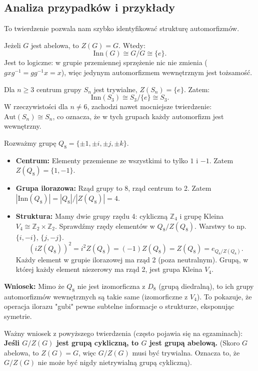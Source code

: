 \subsection{Analiza przypadków i przykłady}

To twierdzenie pozwala nam szybko identyfikować strukturę automorfizmów.

\begin{eg}
Jeżeli $G$ jest abelowa, to $Z(G) = G$. Wtedy:
\[ \text{Inn}(G) \cong G/G \cong \{e\}. \]
Jest to logiczne: w grupie przemiennej sprzężenie nic nie zmienia ($gxg^{-1} = gg^{-1}x = x$), więc jedynym automorfizmem wewnętrznym jest tożsamość.
\end{eg}

\begin{eg}
Dla $n \ge 3$ centrum grupy $S_n$ jest trywialne, $Z(S_n) = \{e\}$.
Zatem:
\[ \text{Inn}(S_3) \cong S_3 / \{e\} \cong S_3. \]
W rzeczywistości dla $n \neq 6$, zachodzi nawet mocniejsze twierdzenie: $\text{Aut}(S_n) \cong S_n$, co oznacza, że w tych grupach każdy automorfizm jest wewnętrzny.
\end{eg}

\begin{eg}
Rozważmy grupę $Q_8 = \{ \pm 1, \pm i, \pm j, \pm k \}$.
\begin{itemize}
    \item \textbf{Centrum:} Elementy przemienne ze wszystkimi to tylko $1$ i $-1$. Zatem $Z(Q_8) = \{1, -1\}$.
    \item \textbf{Grupa ilorazowa:} Rząd grupy to 8, rząd centrum to 2. Zatem $|\text{Inn}(Q_8)| = |Q_8|/|Z(Q_8)| = 4$.
    \item \textbf{Struktura:} Mamy dwie grupy rzędu 4: cykliczną $\mathbb{Z}_4$ i grupę Kleina $V_4 \cong \mathbb{Z}_2 \times \mathbb{Z}_2$.
    Sprawdźmy rzędy elementów w $Q_8/Z(Q_8)$. Warstwy to np. $\{i, -i\}$, $\{j, -j\}$.
    \[ (iZ(Q_8))^2 = i^2 Z(Q_8) = (-1)Z(Q_8) = Z(Q_8) = e_{Q_8/Z(Q_8)}. \]
    Każdy element w grupie ilorazowej ma rząd 2 (poza neutralnym). Grupą, w której każdy element niezerowy ma rząd 2, jest grupa Kleina $V_4$.
\end{itemize}
\textbf{Wniosek:} Mimo że $Q_8$ nie jest izomorficzna z $D_8$ (grupą diedralną), to ich grupy automorfizmów wewnętrznych są takie same (izomorficzne z $V_4$). To pokazuje, że operacja ilorazu "gubi" pewne subtelne informacje o strukturze, eksponując symetrie.
\end{eg}

\begin{lemma}
Ważny wniosek z powyższego twierdzenia (często pojawia się na egzaminach):
\textbf{Jeśli $G/Z(G)$ jest grupą cykliczną, to $G$ jest grupą abelową.}
(Skoro $G$ abelowa, to $Z(G)=G$, więc $G/Z(G)$ musi być trywialna. Oznacza to, że $G/Z(G)$ nie może być nigdy nietrywialną grupą cykliczną).
\end{lemma}




